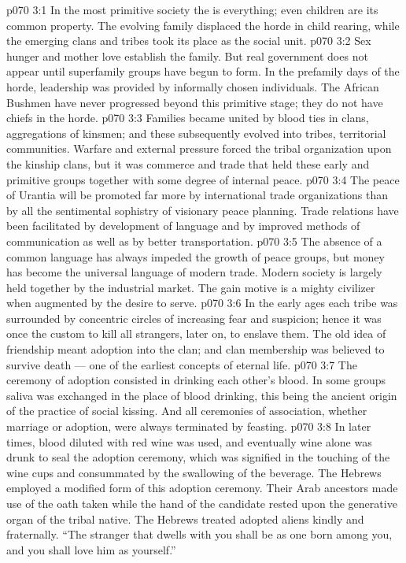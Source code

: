 \vs p070 3:1 In the most primitive society the  is everything; even children are its common property. The evolving family displaced the horde in child rearing, while the emerging clans and tribes took its place as the social unit.
\vs p070 3:2 Sex hunger and mother love establish the family. But real government does not appear until superfamily groups have begun to form. In the prefamily days of the horde, leadership was provided by informally chosen individuals. The African Bushmen have never progressed beyond this primitive stage; they do not have chiefs in the horde.
\vs p070 3:3 \pc Families became united by blood ties in clans, aggregations of kinsmen; and these subsequently evolved into tribes, territorial communities. Warfare and external pressure forced the tribal organization upon the kinship clans, but it was commerce and trade that held these early and primitive groups together with some degree of internal peace.
\vs p070 3:4 The peace of Urantia will be promoted far more by international trade organizations than by all the sentimental sophistry of visionary peace planning. Trade relations have been facilitated by development of language and by improved methods of communication as well as by better transportation.
\vs p070 3:5 The absence of a common language has always impeded the growth of peace groups, but money has become the universal language of modern trade. Modern society is largely held together by the industrial market. The gain motive is a mighty civilizer when augmented by the desire to serve.
\vs p070 3:6 \pc In the early ages each tribe was surrounded by concentric circles of increasing fear and suspicion; hence it was once the custom to kill all strangers, later on, to enslave them. The old idea of friendship meant adoption into the clan; and clan membership was believed to survive death --- one of the earliest concepts of eternal life.
\vs p070 3:7 The ceremony of adoption consisted in drinking each other’s blood. In some groups saliva was exchanged in the place of blood drinking, this being the ancient origin of the practice of social kissing. And all ceremonies of association, whether marriage or adoption, were always terminated by feasting.
\vs p070 3:8 In later times, blood diluted with red wine was used, and eventually wine alone was drunk to seal the adoption ceremony, which was signified in the touching of the wine cups and consummated by the swallowing of the beverage. The Hebrews employed a modified form of this adoption ceremony. Their Arab ancestors made use of the oath taken while the hand of the candidate rested upon the generative organ of the tribal native. The Hebrews treated adopted aliens kindly and fraternally. “The stranger that dwells with you shall be as one born among you, and you shall love him as yourself.”
